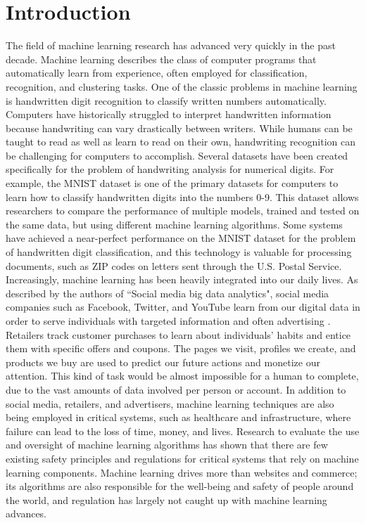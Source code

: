 \chapter{Introduction}

The field of machine learning research has advanced very quickly in the past decade. Machine learning describes the class of computer programs that automatically learn from experience, often employed for classification, recognition, and clustering tasks. One of the classic problems in machine learning is handwritten digit recognition to classify written numbers automatically. Computers have historically struggled to interpret handwritten information because handwriting can vary drastically between writers. While humans can be taught to read as well as learn to read on their own, handwriting recognition can be challenging for computers to accomplish. Several datasets have been created specifically for the problem of handwriting analysis for numerical digits. For example, the MNIST dataset \cite{LBBH98} is one of the primary datasets for computers to learn how to classify handwritten digits into the numbers 0-9. This dataset allows researchers to compare the performance of multiple models, trained and tested on the same data, but using different machine learning algorithms. Some systems have achieved a near-perfect performance on the MNIST dataset for the problem of handwritten digit classification, and this technology is valuable for processing documents, such as ZIP codes on letters sent through the U.S. Postal Service.
\\Increasingly, machine learning has been heavily integrated into our daily lives. As described by the authors of ``Social media big data analytics", social media companies such as Facebook, Twitter, and YouTube learn from our digital data in order to serve individuals with targeted information and often advertising \cite{GHHA19}. Retailers track customer purchases to learn about individuals' habits and entice them with specific offers and coupons. The pages we visit, profiles we create, and products we buy are used to predict our future actions and monetize our attention. This kind of task would be almost impossible for a human to complete, due to the vast amounts of data involved per person or account. In addition to social media, retailers, and advertisers, machine learning techniques are also being employed in critical systems, such as healthcare and infrastructure, where failure can lead to the loss of time, money, and lives. Research to evaluate the use and oversight of machine learning algorithms \cite{Var16} has shown that there are few existing safety principles and regulations for critical systems that rely on machine learning components. Machine learning drives more than websites and commerce; its algorithms are also responsible for the well-being and safety of people around the world, and regulation has largely not caught up with machine learning advances.
